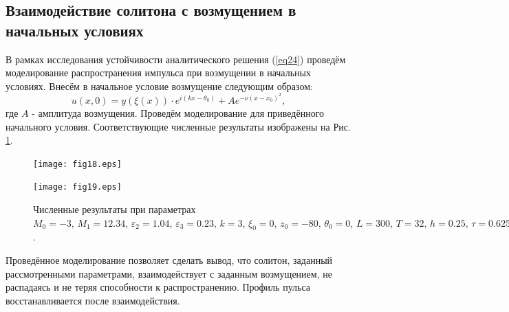 \documentclass[14pt,a4paper]{extreport}
\begin{document}
		\subsection{Взаимодействие солитона с возмущением в начальных условиях}\label{ch330}
			В рамках исследования устойчивости аналитического решения (\ref{eq24}) проведём моделирование распространения импульса при возмущении в начальных условиях. Внесём в начальное условие возмущение следующим образом:
			\begin{equation} \label{eq52}
				u(x,0)=y\left(\xi\left(x\right)\right)\cdot e^{i(kx-\theta_{0})}+Ae^{-\nu(x-x_{0})^{2}},
			\end{equation}
			где \(A\) - амплитуда возмущения. Проведём моделирование для приведённого начального условия.
			Соответствующие численные результаты изображены на Рис. \ref{fig17}.
			\begin{figure}[H] %
				\begin{center}
					\begin{minipage}[h]{0.48\linewidth}
						\texttt{[image: fig18.eps]}
					\end{minipage}
					\hfill
					\begin{minipage}[h]{0.48\linewidth}
						\texttt{[image: fig19.eps]}
					\end{minipage}
				\end{center}
				\caption{Численные результаты при параметрах \(M_{0}=-3,\,M_{1}=12.34,\,\varepsilon_{2}=1.04,\,\varepsilon_{3}=0.23,\, k=3,\, \xi_{0}=0,\,z_{0}=-80,\, \theta_{0}=0,\, L=300,\, T=32,\, h=0.25,\, \tau=0.625,\,A=0.2,\,\nu=0.06,\, x_{0}=25\).}
				\label{fig17}
			\end{figure}
			Проведённое моделирование позволяет сделать вывод, что солитон, заданный рассмотренными параметрами, взаимодействует с заданным возмущением, не распадаясь и не теряя способности к распространению. Профиль пульса восстанавливается после взаимодействия.
\end{document}
